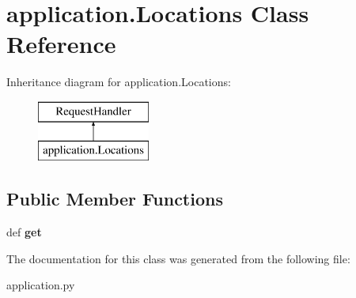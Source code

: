 \hypertarget{classapplication_1_1_locations}{\section{application.\-Locations Class Reference}
\label{classapplication_1_1_locations}
}
Inheritance diagram for application.\-Locations\-:\begin{figure}[H]
\begin{center}
\leavevmode
\includegraphics[height=2.000000cm]{classapplication_1_1_locations}
\end{center}
\end{figure}
\subsection*{Public Member Functions}
\begin{DoxyCompactItemize}
\item 
\hypertarget{classapplication_1_1_locations_a64006805003a30f3ca7b4c15481fa18a}{def {\bfseries get}}\label{classapplication_1_1_locations_a64006805003a30f3ca7b4c15481fa18a}

\end{DoxyCompactItemize}


The documentation for this class was generated from the following file\-:\begin{DoxyCompactItemize}
\item 
application.\-py\end{DoxyCompactItemize}
